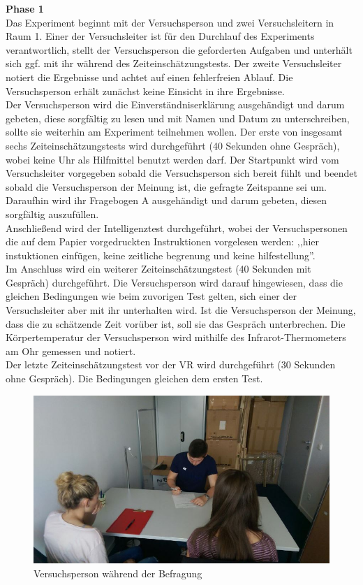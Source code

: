 \documentclass{Bericht}
\begin{document}
\textbf{Phase 1}\\
Das Experiment beginnt mit der Versuchsperson und zwei Versuchsleitern in Raum 1. Einer der Versuchsleiter ist für den Durchlauf des Experiments verantwortlich, stellt der Versuchsperson die geforderten Aufgaben und unterhält sich ggf. mit ihr während des Zeiteinschätzungstests. Der zweite Versuchsleiter notiert die Ergebnisse und achtet auf einen fehlerfreien Ablauf. Die Versuchsperson erhält zunächst keine Einsicht in ihre Ergebnisse.\\
Der Versuchsperson wird die Einverständniserklärung ausgehändigt und darum gebeten, diese sorgfältig zu lesen und mit Namen und Datum zu unterschreiben, sollte sie weiterhin am Experiment teilnehmen wollen.
Der erste von insgesamt sechs Zeiteinschätzungstests wird durchgeführt (40 Sekunden ohne Gespräch), wobei keine Uhr als Hilfmittel benutzt werden darf.
Der Startpunkt wird vom Versuchsleiter vorgegeben sobald die Versuchsperson sich bereit fühlt und beendet sobald die Versuchsperson der Meinung ist, die gefragte Zeitspanne sei um.
Daraufhin wird ihr Fragebogen A ausgehändigt und darum gebeten, diesen sorgfältig auszufüllen.\\
Anschließend wird der Intelligenztest durchgeführt, wobei der Versuchspersonen die auf dem Papier vorgedruckten Instruktionen vorgelesen werden: 
,,hier instuktionen einfügen, keine zeitliche begrenung und keine hilfestellung''.\\
Im Anschluss wird ein weiterer Zeiteinschätzungstest  (40 Sekunden mit Gespräch) durchgeführt. Die Versuchsperson wird darauf hingewiesen, dass die gleichen Bedingungen wie beim zuvorigen Test gelten, sich einer der Versuchsleiter aber mit ihr unterhalten wird. Ist die Versuchsperson der Meinung, dass die zu schätzende Zeit vorüber ist, soll sie das Gespräch unterbrechen. Die Körpertemperatur der Versuchsperson wird mithilfe des Infrarot-Thermometers am Ohr gemessen und notiert.\\
Der letzte Zeiteinschätzungstest vor der VR wird durchgeführt (30 Sekunden ohne Gespräch). Die Bedingungen gleichen dem ersten Test.

\begin{figure}[H]
	\centering    
	\includegraphics[height=\textheight, width=\linewidth, keepaspectratio]{../Bilder/t.jpg}
	\caption{Versuchsperson während der Befragung}
	\label{img:befragung}
\end{figure}
\end{document}
